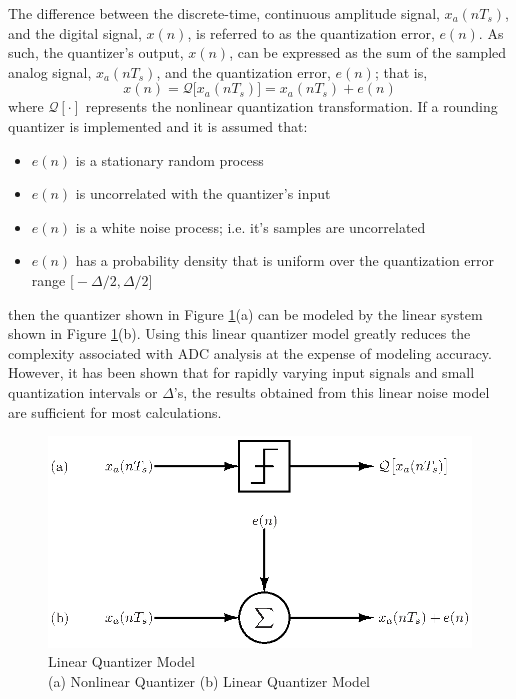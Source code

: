 The difference between the discrete-time, continuous amplitude signal, $x_a(nT_s)$,
and the digital signal, $x(n)$, is referred to as the quantization error, $e(n)$. As such,
the quantizer's output, $x(n)$, can be expressed as the sum of the sampled analog
signal, $x_a(n T_s)$, and the quantization error, $e(n)$; that is,
\begin{equation}\label{eq:quantizer_output}
x(n)=\mathcal{Q}\bigl[x_a(n T_s)\bigr]=x_a(n T_s)+e(n)
\end{equation}
where $\mathcal{Q}[\cdot] $ represents the nonlinear quantization transformation. If a
rounding
quantizer is implemented and it is assumed that:
\begin{itemize}
 \item $e(n)$ is a stationary random process
 \item $e(n)$ is uncorrelated with the quantizer's input
 \item $e(n)$ is a white noise process; i.e. it's samples are uncorrelated
 \item $e(n)$ has a probability density that is uniform over the quantization
error range $\bigl[-\Delta/2,\Delta/2\bigr]$
\end{itemize}
then the quantizer shown in Figure \ref{fig:linear_quantizer_model}(a) can be modeled by
the linear system shown in Figure \ref{fig:linear_quantizer_model}(b)\cite{
gray_quantization_1990}\cite{ oppenheim_discrete-time_1999}. Using this linear
quantizer model greatly reduces the complexity associated with ADC analysis at the expense
of modeling accuracy. However, it has been shown that for rapidly varying input signals
and small quantization intervals or $\Delta$'s, the results obtained from this linear
noise model are sufficient for most
calculations\cite{oppenheim_discrete-time_1999}\cite{hayes_schaums_1998}.
\begin{figure}[htbp]
 \centering
 \includegraphics*[clip,viewport=0 0 330
150]{./final_figures/linear_quantizer_model.eps}
 \captionsetup{justification=centering} 
 \caption[]{Linear Quantizer Model\\(a) Nonlinear Quantizer (b) Linear
Quantizer Model}
 \label{fig:linear_quantizer_model}
\end{figure}

